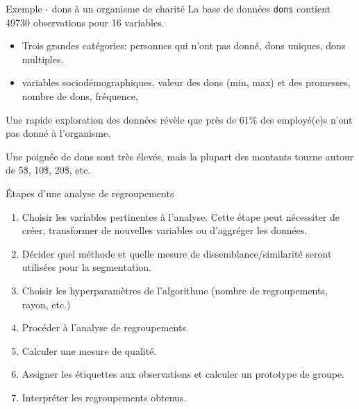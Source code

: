 \documentclass[
  ignorenonframetext,
]{beamer}
\providecommand{\tightlist}{%
  \setlength{\itemsep}{0pt}\setlength{\parskip}{0pt}}\usepackage{longtable,booktabs,array}
\begin{document}
\begin{frame}[fragile]{Exemple - dons à un organisme de charité}
\protect\hypertarget{exemple---dons-uxe0-un-organisme-de-charituxe9}{}
La base de données \texttt{dons} contient 49730 observations pour 16
variables.

\begin{itemize}
\tightlist
\item
  Trois grandes catégories: personnes qui n'ont pas donné, dons uniques,
  dons multiples.
\item
  variables sociodémographiques, valeur des dons (min, max) et des
  promesses, nombre de dons, fréquence,
\end{itemize}

Une rapide exploration des données révèle que près de 61\% des
employé(e)s n'ont pas donné à l'organisme.

Une poignée de dons sont très élevés, mais la plupart des montants
tourne autour de 5\$, 10\$, 20\$, etc.
\end{frame}

\begin{frame}{Étapes d'une analyse de regroupements}
\protect\hypertarget{uxe9tapes-dune-analyse-de-regroupements}{}
\begin{enumerate}
\tightlist
\item
  Choisir les variables pertinentes à l'analyse. Cette étape peut
  nécessiter de créer, transformer de nouvelles variables ou d'aggréger
  les données.
\item
  Décider quel méthode et quelle mesure de dissemblance/similarité
  seront utilisées pour la segmentation.
\item
  Choisir les hyperparamètres de l'algorithme (nombre de regroupements,
  rayon, etc.)
\item
  Procéder à l'analyse de regroupements.
\item
  Calculer une mesure de qualité.
\item
  Assigner les étiquettes aux observations et calculer un prototype de
  groupe.
\item
  Interpréter les regroupements obtenus.
\end{enumerate}
\end{frame}
\end{document}
